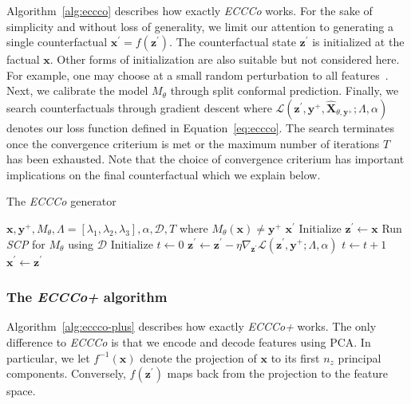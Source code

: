 Algorithm~\ref{alg:eccco} describes how exactly \textit{ECCCo} works. For the sake of simplicity and without loss of generality, we limit our attention to generating a single counterfactual $\mathbf{x}^\prime=f(\mathbf{z}^\prime)$. The counterfactual state $\mathbf{z}^\prime$ is initialized at the factual $\mathbf{x}$. Other forms of initialization are also suitable but not considered here. For example, one may choose at a small random perturbation to all features~\citep{slack2021counterfactual}. Next, we calibrate the model $M_{\theta}$ through split conformal prediction. Finally, we search counterfactuals through gradient descent where $\mathcal{L}(\mathbf{z}^\prime,\mathbf{y}^+,\widehat{\mathbf{X}}_{\theta,\mathbf{y}^+}; \Lambda, \alpha)$ denotes our loss function defined in Equation~\ref{eq:eccco}. The search terminates once the convergence criterium is met or the maximum number of iterations $T$ has been exhausted. Note that the choice of convergence criterium has important implications on the final counterfactual which we explain below.

\begin{algorithm*}[h]
  \caption{The \textit{ECCCo} generator}\label{alg:eccco}
  \begin{algorithmic}[1]
    \Require $\mathbf{x}, \mathbf{y}^+, M_{\theta}, \Lambda=[\lambda_1,\lambda_2,\lambda_3], \alpha, \mathcal{D}, T$ where $M_{\theta}(\mathbf{x})\neq\mathbf{y}^+$
    \Ensure $\mathbf{x}^\prime$
    \State Initialize $\mathbf{z}^\prime \gets \mathbf{x}$ 
    \State Run \textit{SCP} for $M_{\theta}$ using $\mathcal{D}$ 
    \State Initialize $t \gets 0$
     
    \State $\mathbf{z}^\prime \gets \mathbf{z}^\prime - \eta \nabla_{\mathbf{z}^\prime} \mathcal{L}(\mathbf{z}^\prime,\mathbf{y}^+; \Lambda, \alpha)$ 
    \State $t \gets t+1$
    \EndWhile
    \State $\mathbf{x}^\prime \gets \mathbf{z}^\prime$
  \end{algorithmic}
\end{algorithm*}

\subsubsection{The \textit{ECCCo+} algorithm}

Algorithm~\ref{alg:eccco-plus} describes how exactly \textit{ECCCo+} works. The only difference to \textit{ECCCo} is that we encode and decode features using PCA. In particular, we let $f^{-1}(\mathbf{x})$ denote the projection of $\mathbf{x}$ to its first $n_z$ principal components. Conversely, $f(\mathbf{z}^\prime)$ maps back from the projection to the feature space. 

